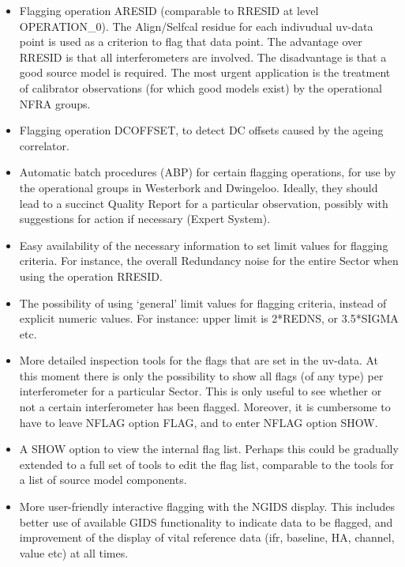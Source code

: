 \begin{itemize}

\item
Flagging operation ARESID (comparable to RRESID at level OPERATION\_0).
The Align/Selfcal residue for each
indivudual uv-data point is used as a criterion to flag that data point.
The advantage over RRESID is that all interferometers are involved.
The disadvantage is that a good source model is required.
The most urgent application is the treatment of calibrator observations
(for which good models exist) by the operational NFRA groups.

\item
Flagging operation DCOFFSET, to detect DC offsets caused by the ageing
correlator.

\item
Automatic batch procedures (ABP) for certain flagging operations,
for use by the operational groups in Westerbork and Dwingeloo.
Ideally, they should lead to a succinct Quality Report for a particular
observation, possibly with suggestions for action if necessary (Expert
System).

\item
Easy availability of the necessary information to set limit values for
flagging criteria. For instance, the overall Redundancy noise for the
entire Sector when using the operation RRESID.

\item
The possibility of using `general' limit values for flagging criteria,
instead of explicit numeric values.
For instance: upper limit is 2*REDNS, or 3.5*SIGMA etc.

\item
More detailed inspection tools for the flags that are set in the uv-data. At
this moment there is only the possibility to show all flags (of any type) per
interferometer for a particular Sector. This is only useful to see whether or
not a certain interferometer has been flagged. Moreover, it is cumbersome to
have to leave NFLAG option FLAG, and to enter NFLAG option SHOW.

\item
A SHOW option to view the internal flag list. Perhaps this could be
gradually extended to a full set of tools to edit the flag list, comparable
to the tools for a list of source model components.

\item
More user-friendly interactive flagging with the NGIDS display.
This includes better use of available GIDS functionality to
indicate data to be flagged, and improvement of the display of vital
reference data (ifr, baseline, HA, channel, value etc) at all times.


\end{itemize}
